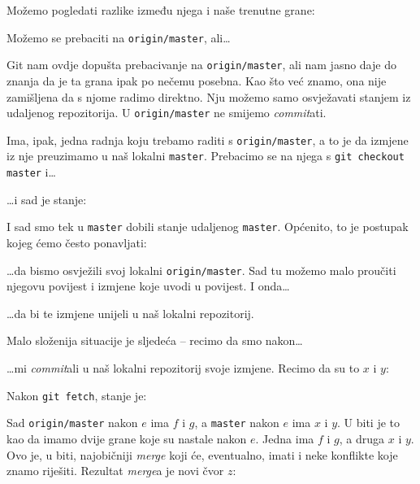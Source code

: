 Možemo pogledati razlike između njega i naše trenutne grane:


Možemo se prebaciti na \verb+origin/master+, ali\dots



Git nam ovdje dopušta prebacivanje na \verb+origin/master+, ali nam jasno daje do znanja da je ta grana ipak po nečemu posebna.
Kao što već znamo, ona nije zamišljena da s njome radimo direktno.
Nju možemo samo osvježavati stanjem iz udaljenog repozitorija.
U \verb+origin/master+ ne smijemo \emph{commit}ati.

Ima, ipak, jedna radnja koju trebamo raditi s \verb+origin/master+, a to je da izmjene iz nje preuzimamo u naš lokalni \verb+master+.
Prebacimo se na njega s \verb+git checkout master+ i\dots{}


\dots{}i sad je stanje:



I sad smo tek u \verb+master+ dobili stanje udaljenog \verb+master+.
Općenito, to je postupak kojeg ćemo često ponavljati:


\dots{}da bismo osvježili svoj lokalni \verb+origin/master+.
Sad tu možemo malo proučiti njegovu povijest i izmjene koje uvodi u povijest.
I onda\dots


\dots{}da bi te izmjene unijeli u naš lokalni repozitorij.

Malo složenija situacije je sljedeća -- recimo da smo nakon\dots{}



\dots{}mi \emph{commit}ali u naš lokalni repozitorij svoje izmjene. Recimo da su to $x$ i $y$:



Nakon \verb+git fetch+, stanje je:



Sad \verb+origin/master+ nakon $e$ ima $f$ i $g$, a \verb+master+ nakon $e$ ima $x$ i $y$.
U biti je to kao da imamo dvije grane koje su nastale nakon $e$. Jedna ima $f$ i $g$, a druga $x$ i $y$.
Ovo je, u biti, najobičniji \emph{merge} koji će, eventualno, imati i neke konflikte koje znamo riješiti.
Rezultat \emph{merge}a je novi čvor $z$:

